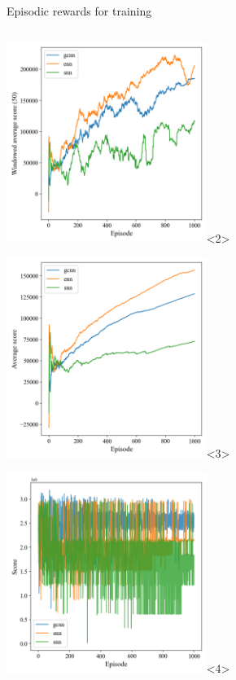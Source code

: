 \documentclass[english, aspectratio=169]{beamer}
\begin{document}
\begin{frame}{Episodic rewards for training}
\begin{columns}
\begin{column}{0.5\textwidth}
\begin{center}
\begin{scriptsize}
	\includegraphics[width=6.5cm, keepaspectratio]{images/windowed_scores_comparison_test_5_intersection}<2>	
	
	\includegraphics[width=6.5cm, keepaspectratio]{images/average_scores_comparison_test_5_intersection}<3>	
			
	\includegraphics[width=6.5cm, keepaspectratio]{images/scores_history_comparison_test_5_intersection_empty}<4>	
	

\end{scriptsize}
\end{center}
\end{column}
\end{columns}
\end{frame}
\end{document}
